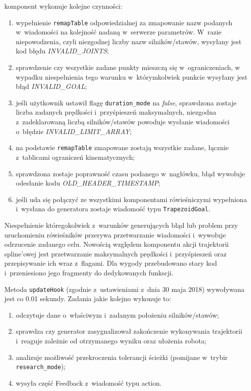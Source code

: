 \documentclass[a4paper, 12pt]{article}
\begin{document}
	komponent wykonuje kolejne czynności:
	\begin{enumerate}
	\item wypełnienie \texttt{remapTable} odpowiedzialnej za zmapowanie nazw podanych w~wiadomości na kolejność nadaną w~serwerze parametrów. W~razie niepowodzenia, czyli niezgodnej liczby nazw silników/stawów, wysyłany jest kod błędu \textit{INVALID\_JOINTS}; 
	\item sprawdzenie czy wszystkie zadane punkty mieszczą się w~ograniczeniach, w wypadku niespełnienia tego warunku w~którymkolwiek punkcie wysyłany jest błąd  \textit{INVALID\_GOAL};
	\item jeśli użytkownik ustawił flagę \texttt{duration\_mode} na \textit{false}, sprawdzona zostaje liczba zadanych prędkości i~przyśpieszeń maksymalnych, niezgodna z~zadeklarowaną liczbą silników/stawów powoduje wysłanie wiadomości o~błędzie \textit{INVALID\_LIMIT\_ARRAY};
	\item na podstawie \texttt{remapTable} zmapowane zostają wszystkie zadane, łącznie z~tablicami ograniczeń kinematycznych;
	\item sprawdzona zostaje poprawność czasu podanego w~nagłówku, błąd wywołuje odesłanie kodu \textit{OLD\_HEADER\_TIMESTAMP};
	\item jeśli uda się połączyć ze wszystkimi komponentami rówieśniczymi wypełniona i~wysłana do generatora zostaje wiadomość typu \texttt{TrapezoidGoal}.
	\end{enumerate}
	Niespełnienie któregokolwiek z~warunków generujących błąd lub problem przy uruchomieniu rówieśników przerywa przetwarzanie wiadomości i~wywołuje odrzucenie zadanego celu. Nowością względem komponentu akcji trajektorii spline'owej jest przetwarzanie maksymalnych prędkości i~przyśpieszeń oraz przepisywanie ich wraz z~flagami. Dla wygody przebudowano stary kod i~przeniesiono jego fragmenty do dedykowanych funkscji.
	\par Metoda \texttt{updateHook} (zgodnie z~ustawieniami z~dnia 30 maja 2018) wywoływana jest co 0.01 sekundy. Zadania jakie kolejno wykonuje to:
	\begin{enumerate}
	\item odczytuje dane o~właściwym i~zadanym położeniu silników/stawów;
	\item sprawdza czy generator zasygnalizował zakończenie wykonywania trajektorii i~reaguje zależnie od otrzymanego wyniku oraz ułożenia robota;
	\item analizuje możliwość przekroczenia tolerancji ścieżki (pomijane w~trybir \texttt{research\_mode});
	\item wysyła część Feedback z~wiadomość typu action.
	\end{enumerate}
\end{document}
